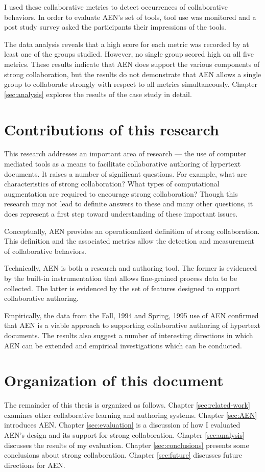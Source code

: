I used these collaborative metrics to detect occurrences of 
collaborative behaviors.  In order to evaluate AEN's set of tools, tool use
was monitored and a post study survey asked the participants their
impressions of the tools.

The data analysis reveals that a high score for each metric was recorded by
at least one of the groups studied.  However, no single group scored high
on all five metrics.  These results indicate that AEN does support the
various components of strong collaboration, but the results do not
demonstrate that AEN allows a single group to collaborate strongly with
respect to all metrics simultaneously.  Chapter \ref{sec:analysis} explores
the results of the case study in detail.

\section{Contributions of this research}

This research addresses an important area of research --- the use of
computer mediated tools as a means to facilitate collaborative authoring of
hypertext documents.  It raises a number of significant questions.  For
example, what are characteristics of strong collaboration?  What types of
computational augmentation are required to encourage strong collaboration?
Though this research may not lead to definite answers to these and many
other questions, it does represent a first step toward understanding of
these important issues.

Conceptually, AEN provides an operationalized definition of strong
collaboration.  This definition and the associated metrics allow the
detection and measurement of collaborative behaviors.

Technically, AEN is both a research and authoring tool.  The former is
evidenced by the built-in instrumentation that allows fine-grained process
data to be collected.  The latter is evidenced by the set of features
designed to support collaborative authoring.

Empirically, the data from the Fall, 1994 and Spring, 1995 use of AEN
confirmed that AEN is a viable approach to supporting collaborative
authoring of hypertext documents.  The results also suggest a number of
interesting directions in which AEN can be extended and empirical
investigations which can be conducted.

\section{Organization of this document}

The remainder of this thesis is organized as follows. Chapter
\ref{sec:related-work} examines other collaborative learning and authoring
systems.  Chapter \ref{sec:AEN} introduces AEN.  Chapter
\ref{sec:evaluation} is a discussion of how I evaluated AEN's design and
its support for strong collaboration.  Chapter \ref{sec:analysis} discusses
the results of my evaluation.  Chapter \ref{sec:conclusions} presents some
conclusions about strong collaboration.  Chapter \ref{sec:future} discusses
future directions for AEN.




